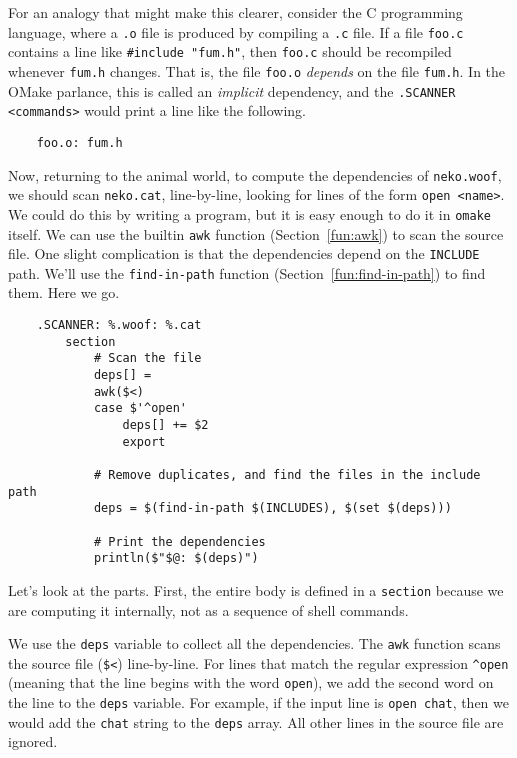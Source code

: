 For an analogy that might make this clearer, consider the C programming language, where a \verb+.o+
file is produced by compiling a \verb+.c+ file.  If a file \verb+foo.c+ contains a line like
\verb+#include "fum.h"+, then \verb+foo.c+ should be recompiled whenever \verb+fum.h+ changes.  That
is, the file \verb+foo.o+ \emph{depends} on the file \verb+fum.h+.  In the OMake parlance, this is
called an \emph{implicit} dependency, and the \verb+.SCANNER+ \verb+<commands>+ would print a line
like the following.

\begin{verbatim}
    foo.o: fum.h
\end{verbatim}

 Now, returning to the animal world, to compute the dependencies of \verb+neko.woof+, we
should scan \verb+neko.cat+, line-by-line, looking for lines of the form \verb+open <name>+.  We
could do this by writing a program, but it is easy enough to do it in \verb+omake+ itself.  We can
use the builtin \verb+awk+ function (Section~\ref{fun:awk}) to scan the source file.  One slight complication
is that the dependencies depend on the \verb+INCLUDE+ path.  We'll use the
\verb+find-in-path+ function (Section~\ref{fun:find-in-path}) to find them.  Here we go.

\begin{verbatim}
    .SCANNER: %.woof: %.cat
        section
            # Scan the file
            deps[] =
            awk($<)
            case $'^open'
                deps[] += $2
                export

            # Remove duplicates, and find the files in the include path
            deps = $(find-in-path $(INCLUDES), $(set $(deps)))

            # Print the dependencies
            println($"$@: $(deps)")
\end{verbatim}

Let's look at the parts.  First, the entire body is defined in a \verb+section+ because we are
computing it internally, not as a sequence of shell commands.

We use the \verb+deps+ variable to collect all the dependencies.  The \verb+awk+ function scans the
source file (\verb+$<+) line-by-line.  For lines that match the regular expression \verb+^open+
(meaning that the line begins with the word \verb+open+), we add the second word on the line to the
\verb+deps+ variable.  For example, if the input line is \verb+open chat+, then we would add the
\verb+chat+ string to the \verb+deps+ array.  All other lines in the source file are ignored.


